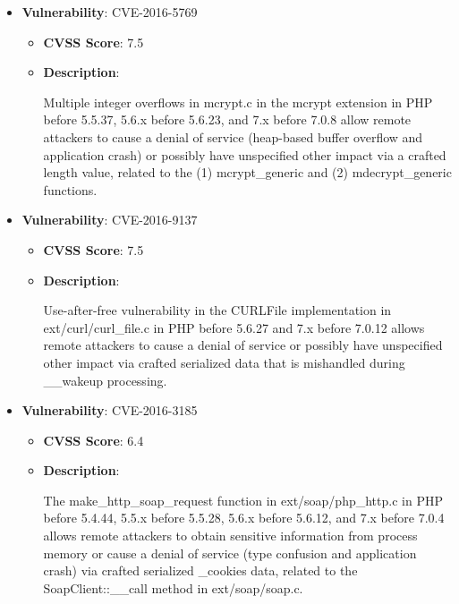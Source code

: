 \documentclass{article}
\begin{document}
\begin{itemize}
        \item \textbf{Vulnerability}: CVE-2016-5769
        \begin{itemize}
            \item \textbf{CVSS Score}:  7.5 
            \item \textbf{Description}:
            \parbox[t]{0.9\linewidth}{
                \ttfamily Multiple integer overflows in mcrypt.c in the mcrypt extension in PHP before 5.5.37, 5.6.x before 5.6.23, and 7.x before 7.0.8 allow remote attackers to cause a denial of service (heap-based buffer overflow and application crash) or possibly have unspecified other impact via a crafted length value, related to the (1) mcrypt\_generic and (2) mdecrypt\_generic functions.
            }
        \end{itemize}
    
        \item \textbf{Vulnerability}: CVE-2016-9137
        \begin{itemize}
            \item \textbf{CVSS Score}:  7.5 
            \item \textbf{Description}:
            \parbox[t]{0.9\linewidth}{
                \ttfamily Use-after-free vulnerability in the CURLFile implementation in ext/curl/curl\_file.c in PHP before 5.6.27 and 7.x before 7.0.12 allows remote attackers to cause a denial of service or possibly have unspecified other impact via crafted serialized data that is mishandled during \_\_wakeup processing.
            }
        \end{itemize}
    
        \item \textbf{Vulnerability}: CVE-2016-3185
        \begin{itemize}
            \item \textbf{CVSS Score}:  6.4 
            \item \textbf{Description}:
            \parbox[t]{0.9\linewidth}{
                \ttfamily The make\_http\_soap\_request function in ext/soap/php\_http.c in PHP before 5.4.44, 5.5.x before 5.5.28, 5.6.x before 5.6.12, and 7.x before 7.0.4 allows remote attackers to obtain sensitive information from process memory or cause a denial of service (type confusion and application crash) via crafted serialized \_cookies data, related to the SoapClient::\_\_call method in ext/soap/soap.c.
            }
        \end{itemize}
    

\end{itemize}
\end{document}
